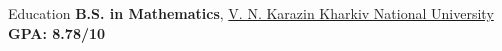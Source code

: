 \begin{cvsection}{Education}
    {\bf B.S. in Mathematics}, \href{https://univer.kharkov.ua/en}{V. N. Karazin Kharkiv National University} \hfill \textbf{GPA: 8.78/10} 
\end{cvsection}
